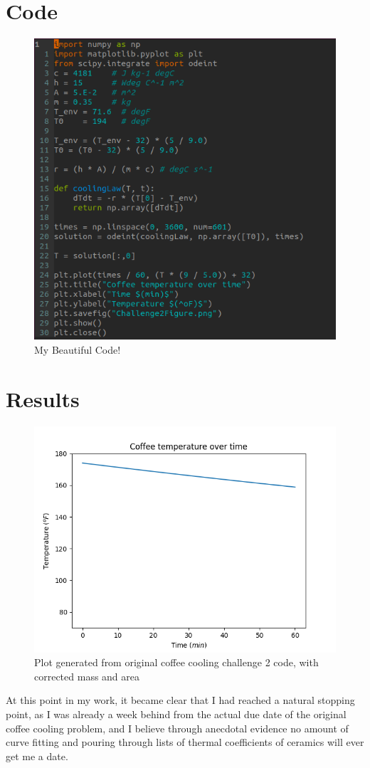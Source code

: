 \documentclass[12pt]{article}
\begin{document}
\section{Code}
\begin{figure}[H]
  \includegraphics[width=\linewidth]{CodeSnippetCC2.png}
  \caption{My Beautiful Code!}
  \label{fig:mBC}
\end{figure}

\section{Results}
\begin{figure}[H]
  \includegraphics[width=\linewidth]{Challenge2Figure.png}
  \caption{Plot generated from original coffee cooling challenge 2 code, with corrected mass and area}
  \label{fig:plt1}
\end{figure}
 At this point in my work, it became clear that I had reached a natural stopping point, as I was already a week behind from the actual due date of the original coffee cooling problem, and I believe through anecdotal evidence no amount of curve fitting and pouring through lists of thermal coefficients of ceramics will ever get me a date.
\end{document}

